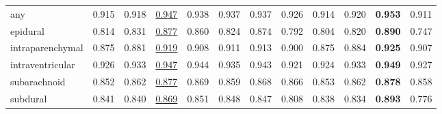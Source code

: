 \begin{minipage}{\textwidth}
{\begin{tabular}{@{}lccccccccccc@{}}
any & 0.915 & 0.918 & \underline{0.947} & 0.938 & 0.937 & 0.937 & 0.926 & 0.914 & 0.920 & \textbf{0.953} & 0.911 \\
epidural & 0.814 & 0.831 & \underline{0.877} & 0.860 & 0.824 & 0.874 & 0.792 & 0.804 & 0.820 & \textbf{0.890} & 0.747 \\
intraparenchymal & 0.875 & 0.881 & \underline{0.919} & 0.908 & 0.911 & 0.913 & 0.900 & 0.875 & 0.884 & \textbf{0.925} & 0.907 \\
intraventricular & 0.926 & 0.933 & \underline{0.947} & 0.944 & 0.935 & 0.943 & 0.921 & 0.924 & 0.933 & \textbf{0.949} & 0.927 \\
subarachnoid & 0.852 & 0.862 & \underline{0.877} & 0.869 & 0.859 & 0.868 & 0.866 & 0.853 & 0.862 & \textbf{0.878} & 0.858 \\
subdural & 0.841 & 0.840 & \underline{0.869} & 0.851 & 0.848 & 0.847 & 0.808 & 0.838 & 0.834 & \textbf{0.893} & 0.776 \\
\bottomrule
\end{tabular}
}\end{minipage}
\par\bigskip
